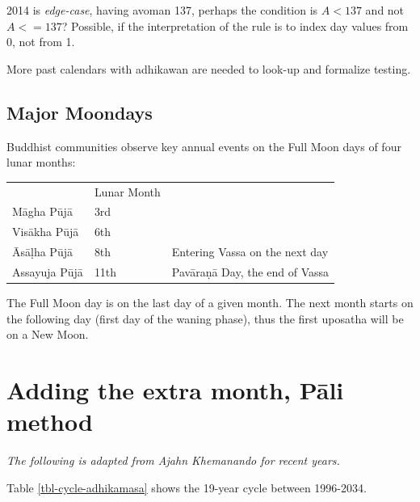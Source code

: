 \documentclass[11pt,oneside]{memoir-article}
\begin{document}
2014 is \emph{edge-case}, having avoman 137, perhaps the condition is $A <
137$ and not $A <= 137$? Possible, if the interpretation of the rule
is to index day values from 0, not from 1.

More past calendars with adhikawan are needed to look-up and formalize
testing.

\section{Major Moondays}
\label{sec-1-4}

Buddhist communities observe key annual events on the Full Moon
days of four lunar months:

\begin{center}
\begin{tabular}{lll}
 & Lunar Month & \\
Māgha Pūjā & 3rd & \\
Visākha Pūjā & 6th & \\
Āsāḷha Pūjā & 8th & Entering Vassa on the next day\\
Assayuja Pūjā & 11th & Pavāraṇā Day, the end of Vassa\\
\end{tabular}
\end{center}

The Full Moon day is on the last day of a given month. The next month
starts on the following day (first day of the waning phase), thus the
first uposatha will be on a New Moon.

\chapter{Adding the extra month, Pāli method}
\label{sec-2}
\label{pali-method}

\emph{The following is adapted from Ajahn Khemanando for recent
years.}\cite{khemanando-adhikamasa}

Table \ref{tbl-cycle-adhikamasa} shows the 19-year cycle between
1996-2034.
\end{document}
